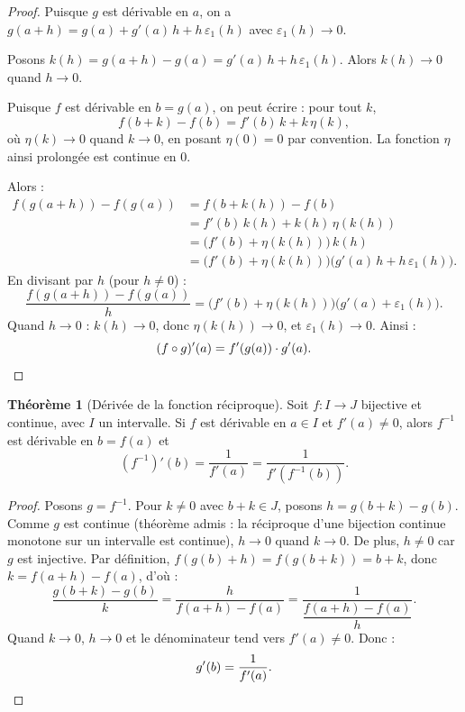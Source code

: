 \documentclass[12pt,a4paper,openany]{book}
\theoremstyle{definition}
\newtheorem{theoreme}{Théorème}[chapter]
\begin{document}
\begin{proof}
Puisque $g$ est dérivable en $a$, on a $g(a+h) = g(a) + g'(a)\,h + h\,\varepsilon_1(h)$ avec $\varepsilon_1(h) \to 0$.

Posons $k(h) = g(a+h) - g(a) = g'(a)\,h + h\,\varepsilon_1(h)$. Alors $k(h) \to 0$ quand $h \to 0$.

Puisque $f$ est dérivable en $b = g(a)$, on peut écrire : pour tout $k$,
\[
  f(b + k) - f(b) = f'(b)\,k + k\,\eta(k),
\]
où $\eta(k) \to 0$ quand $k \to 0$, en posant $\eta(0) = 0$ par convention. La fonction $\eta$ ainsi prolongée est continue en $0$.

Alors :
\begin{align*}
  f(g(a+h)) - f(g(a))
  &= f(b + k(h)) - f(b) \\
  &= f'(b)\,k(h) + k(h)\,\eta(k(h)) \\
  &= \bigl(f'(b) + \eta(k(h))\bigr)\,k(h) \\
  &= \bigl(f'(b) + \eta(k(h))\bigr)\bigl(g'(a)\,h + h\,\varepsilon_1(h)\bigr).
\end{align*}
En divisant par $h$ (pour $h \neq 0$) :
\[
  \frac{f(g(a+h)) - f(g(a))}{h}
  = \bigl(f'(b) + \eta(k(h))\bigr)\bigl(g'(a) + \varepsilon_1(h)\bigr).
\]
Quand $h \to 0$ : $k(h) \to 0$, donc $\eta(k(h)) \to 0$, et $\varepsilon_1(h) \to 0$. Ainsi :
\[
  (f \circ g)'(a) = f'(g(a)) \cdot g'(a). \qedhere
\]
\end{proof}

\begin{theoreme}[Dérivée de la fonction réciproque]\label{thm:derivee-reciproque}
Soit $f \colon I \to J$ bijective et continue, avec $I$ un intervalle. Si $f$ est dérivable en $a \in I$ et $f'(a) \neq 0$, alors $f^{-1}$ est dérivable en $b = f(a)$ et
\[
  (f^{-1})'(b) = \frac{1}{f'(a)} = \frac{1}{f'(f^{-1}(b))}.
\]
\end{theoreme}

\begin{proof}
Posons $g = f^{-1}$. Pour $k \neq 0$ avec $b + k \in J$, posons $h = g(b+k) - g(b)$. Comme $g$ est continue (théorème admis : la réciproque d'une bijection continue monotone sur un intervalle est continue), $h \to 0$ quand $k \to 0$. De plus, $h \neq 0$ car $g$ est injective. Par définition, $f(g(b) + h) = f(g(b+k)) = b + k$, donc $k = f(a + h) - f(a)$, d'où :
\[
  \frac{g(b+k) - g(b)}{k} = \frac{h}{f(a+h) - f(a)}
  = \frac{1}{\dfrac{f(a+h) - f(a)}{h}}.
\]
Quand $k \to 0$, $h \to 0$ et le dénominateur tend vers $f'(a) \neq 0$. Donc :
\[
  g'(b) = \frac{1}{f'(a)}. \qedhere
\]
\end{proof}
\end{document}

